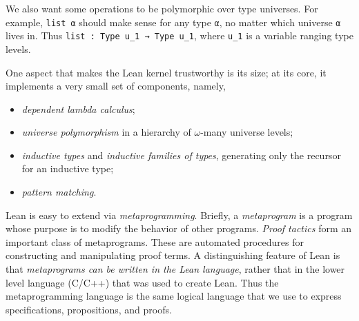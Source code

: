 \documentclass[11pt]{amsart}  %
\begin{document}
We also want some operations to be polymorphic over type universes. For example,  \lstinline{list α} should make sense for any type  \lstinline{α}, no matter which universe  \lstinline{α} lives in. Thus \lstinline{list : Type u_1 → Type u_1}, where \lstinline{u_1} is a variable ranging type levels. 

One aspect that makes the Lean kernel trustworthy is its size; at its core, it implements a very small set of components, namely,
\begin{itemize}
  \item \emph{dependent lambda calculus};
  \item \emph{universe polymorphism} in a hierarchy of $\omega$-many universe levels;
  \item \emph{inductive types} and \emph{inductive families of types}, generating only the recursor for an inductive type;
  \item \emph{pattern matching}.
\end{itemize}


Lean is easy to extend via \emph{metaprogramming}. Briefly, a \emph{metaprogram} is
a program whose purpose is to modify the behavior of other programs. \emph{Proof tactics} form an important class of metaprograms. These are automated procedures for constructing and manipulating proof terms. A distinguishing feature of Lean is that \emph{metaprograms can be written in the Lean language}, rather that in the lower level language (C/C++) that was used to create Lean. Thus the metaprogramming language is the same logical language that we use to express specifications, propositions, and proofs.
\end{document}
